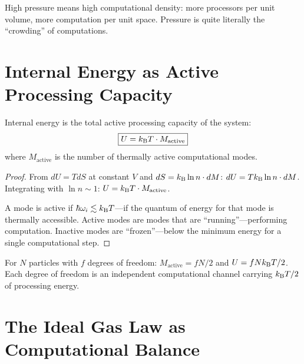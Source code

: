 \begin{remark}
High pressure means high computational density: more processors per unit volume, more computation per unit space. Pressure is quite literally the ``crowding'' of computations.
\end{remark}

\section{Internal Energy as Active Processing Capacity}
\label{sec:energy_capacity}

\begin{theorem}
\label{thm:energy_capacity}
Internal energy is the total active processing capacity of the system:
\begin{equation}
\boxed{U = k_{\mathrm{B}} T \cdot M_{\mathrm{active}}}
\end{equation}
where $M_{\mathrm{active}}$ is the number of thermally active computational modes.
\end{theorem}

\begin{proof}
From $dU = TdS$ at constant $V$ and $dS = k_{\mathrm{B}} \ln n \cdot dM$: $dU = Tk_{\mathrm{B}} \ln n \cdot dM$. Integrating with $\ln n \sim 1$: $U = k_{\mathrm{B}} T \cdot M_{\mathrm{active}}$.

A mode is active if $\hbar\omega_i \lesssim k_{\mathrm{B}} T$---if the quantum of energy for that mode is thermally accessible. Active modes are modes that are ``running''---performing computation. Inactive modes are ``frozen''---below the minimum energy for a single computational step.
\end{proof}

\begin{corollary}
For $N$ particles with $f$ degrees of freedom: $M_{\mathrm{active}} = fN/2$ and $U = fNk_{\mathrm{B}} T/2$. Each degree of freedom is an independent computational channel carrying $k_{\mathrm{B}} T/2$ of processing energy.
\end{corollary}

\section{The Ideal Gas Law as Computational Balance}
\label{sec:gas_law_computation}

